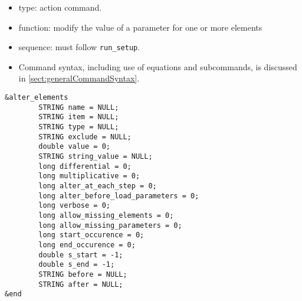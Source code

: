 \documentclass[11pt]{article}
\begin{document}
\begin{itemize}
\item type: action command.
\item function: modify the value of a parameter for one or more elements
\item sequence: must follow \verb|run_setup|.
\item Command syntax, including use of equations and subcommands, is discussed in \ref{sect:generalCommandSyntax}.
\end{itemize}

\begin{verbatim}
&alter_elements
        STRING name = NULL;
        STRING item = NULL;
        STRING type = NULL;
        STRING exclude = NULL;
        double value = 0;
        STRING string_value = NULL;
        long differential = 0;
        long multiplicative = 0;
        long alter_at_each_step = 0;
        long alter_before_load_parameters = 0;
        long verbose = 0;
        long allow_missing_elements = 0;
        long allow_missing_parameters = 0;
        long start_occurence = 0;
        long end_occurence = 0;
        double s_start = -1;
        double s_end = -1;
        STRING before = NULL;
        STRING after = NULL;
&end
\end{verbatim}
\end{document}
